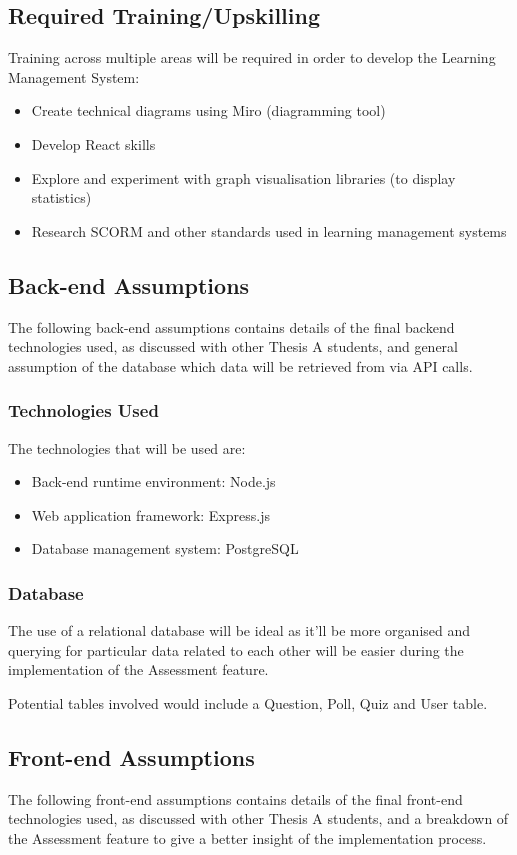 \subsection{Required Training/Upskilling}
Training across multiple areas will be required in order to develop the Learning Management System:

\begin{itemize}
	\item Create technical diagrams using Miro (diagramming tool)
	\item Develop React skills
	\item Explore and experiment with graph visualisation libraries (to display statistics)
	\item Research SCORM and other standards used in learning management systems
\end{itemize}

\subsection{Back-end Assumptions}
The following back-end assumptions contains details of the final backend technologies used, as discussed with other Thesis A students, and general assumption of the database which data will be retrieved from via API calls. 

\subsubsection{Technologies Used}
The technologies that will be used are:
\begin{itemize}
	\item Back-end runtime environment: Node.js
	\item Web application framework: Express.js
	\item Database management system: PostgreSQL
\end{itemize}

\subsubsection{Database}
The use of a relational database will be ideal as it'll be more organised and querying for particular data related to each other will be easier during the implementation of the Assessment feature. 

Potential tables involved would include a Question, Poll, Quiz and User table. 


\subsection{Front-end Assumptions}
The following front-end assumptions contains details of the final front-end technologies used, as discussed with other Thesis A students, and a breakdown of the Assessment feature to give a better insight of the implementation process.

